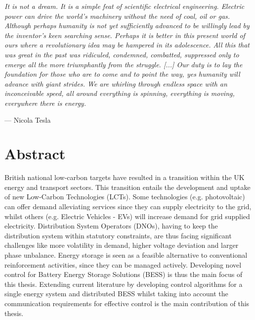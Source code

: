 
\epigraph{\textit{It is not a dream. It is a simple feat of scientific electrical engineering. Electric power can drive the world's machinery without the need of coal, oil or gas. Although perhaps humanity is not yet sufficiently advanced to be willingly lead by the inventor's keen searching sense. Perhaps it is better in this present world of ours where a revolutionary idea may be hampered in its adolescence. All this that was great in the past was ridiculed, condemned, combatted, suppressed only to emerge all the more triumphantly from the struggle. [...] Our duty is to lay the foundation for those who are to come and to point the way, yes humanity will advance with giant strides. We are whirling through endless space with an inconceivable speed, all around everything is spinning, everything is moving, everywhere there is energy.}}{--- Nicola Tesla}


\chapter*{Abstract}




British national low-carbon targets have resulted in a transition within the UK\linebreak
energy and transport sectors. This transition entails the development and uptake of\linebreak
new Low-Carbon Technologies (LCTs). Some technologies (e.g. photovoltaic) can\linebreak
offer demand alleviating services since they can supply electricity to the grid,\linebreak
whilst others (e.g. Electric Vehicles - EVs) will increase demand for grid supplied\linebreak
electricity. Distribution System Operators (DNOs), having to keep the distribution\linebreak
system within statutory constraints, are thus facing significant challenges like\linebreak
more volatility in demand, higher voltage deviation and larger phase unbalance.\linebreak
Energy storage is seen as a feasible alternative to conventional reinforcement\linebreak
activities, since they can be managed actively. Developing novel control for\linebreak
Battery Energy Storage Solutions (BESS) is thus the main focus of this thesis.\linebreak
Extending current literature by developing control algorithms for a single \linebreak
energy system and distributed BESS whilst taking into account the communication\linebreak
requirements for effective control is the main contribution of this thesis.

